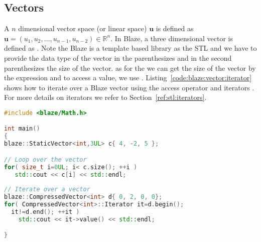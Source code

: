 \subsection{Vectors}
\label{sec:linalg:vectors}
A $n$ dimensional vector space (or linear space) $\mathbf{u}$ is defined as $\mathbf{u}=(u_1,u_2,\ldots,u_{n-1},u_{n-2})\in \mathbb{R}^n$. In Blaze, a three dimensional vector is defined as . Note the Blaze is a template based library as the STL and we have to provide the data type of the vector in the parenthesizes  and in the second parenthesizes  the size of the vector. as for the  we can get the size of the vector by the expression  and to access a value, we use . Listing~\ref{code:blaze:vector:iterator} shows how to iterate over a Blaze vector using the access operator  and iterators . For more details on iterators we refer to Section~\ref{ref:stl:iterators}. \\

\begin{lstlisting}[language=c++,caption={Iterating over a Blaze vector using a for loop with iterators.\label{code:blaze:vector:iterator}},float,floatplacement=tb]
#include <blaze/Math.h>

int main()
{
blaze::StaticVector<int,3UL> c{ 4, -2, 5 };

// Loop over the vector
for( size_t i=0UL; i< c.size(); ++i )
   std::cout << c[i] << std::endl;
   
// Iterate over a vector
blaze::CompressedVector<int> d{ 0, 2, 0, 0};
for( CompressedVector<int>::Iterator it=d.begin(); 
  it!=d.end(); ++it ) 
    std::cout << it->value() << std::endl;

}
\end{lstlisting}

